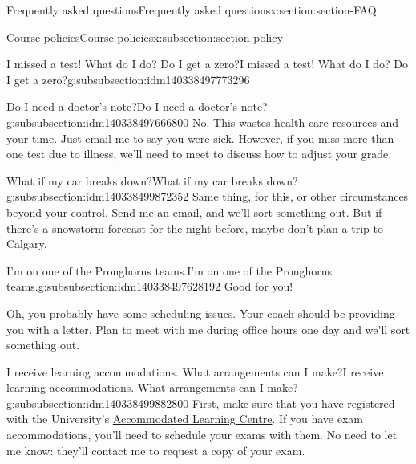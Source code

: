 \documentclass[oneside,10pt,]{article}
\begin{document}
\begin{sectionptx}{Frequently asked questions}{}{Frequently asked questions}{}{}{x:section:section-FAQ}
\begin{subsectionptx}{Course policies}{}{Course policies}{}{}{x:subsection:section-policy}
\begin{subsubsectionptx}{I missed a test! What do I do? Do I get a zero?}{}{I missed a test! What do I do? Do I get a zero?}{}{}{g:subsubsection:idm140338497773296}
\end{subsubsectionptx}
%
%
\typeout{************************************************}
\typeout{************************************************}
%
\begin{subsubsectionptx}{Do I need a doctor's note?}{}{Do I need a doctor's note?}{}{}{g:subsubsection:idm140338497666800}
No. This wastes health care resources and your time. Just email me to say you were sick. However, if you miss more than one test due to illness, we'll need to meet to discuss how to adjust your grade.%
\end{subsubsectionptx}
%
%
\typeout{************************************************}
\typeout{************************************************}
%
\begin{subsubsectionptx}{What if my car breaks down?}{}{What if my car breaks down?}{}{}{g:subsubsection:idm140338499872352}
Same thing, for this, or other circumstances beyond your control. Send me an email, and we'll sort something out. But if there's a snowstorm forecast for the night before, maybe don't plan a trip to Calgary.%
\end{subsubsectionptx}
%
%
\typeout{************************************************}
\typeout{************************************************}
%
\begin{subsubsectionptx}{I'm on one of the Pronghorns teams.}{}{I'm on one of the Pronghorns teams.}{}{}{g:subsubsection:idm140338497628192}
Good for you!%
\par
Oh, you probably have some scheduling issues. Your coach should be providing you with a letter. Plan to meet with me during office hours one day and we'll sort something out.%
\end{subsubsectionptx}
%
%
\typeout{************************************************}
\typeout{************************************************}
%
\begin{subsubsectionptx}{I receive learning accommodations. What arrangements can I make?}{}{I receive learning accommodations. What arrangements can I make?}{}{}{g:subsubsection:idm140338499882800}
First, make sure that you have registered with the University's \href{https://www.uleth.ca/ross/accommodated-learning-centre}{Accommodated Learning Centre}. If you have exam accommodations, you'll need to schedule your exams with them. No need to let me know: they'll contact me to request a copy of your exam.%

\end{subsubsectionptx}
\end{subsectionptx}
\end{sectionptx}
\end{document}
